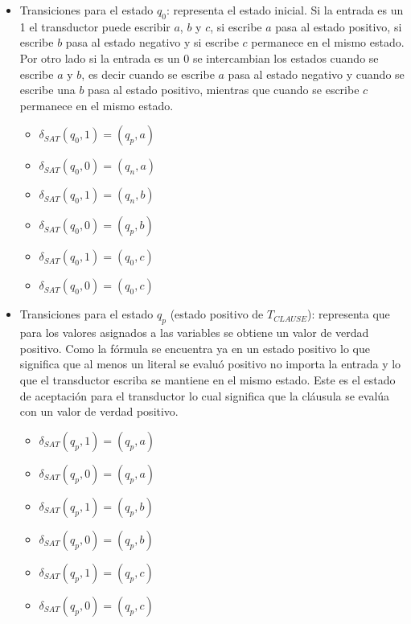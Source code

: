 \documentclass[12pt]{article}
\begin{document}
\begin{itemize}
    \item Transiciones para el estado $q_0$: representa el estado inicial. Si la entrada es un 1 el
          transductor puede escribir $a$, $b$ y $c$, si escribe $a$ pasa al estado positivo, si escribe $b$
          pasa al estado negativo y si escribe $c$ permanece en el mismo estado. Por otro lado si la entrada 
          es un 0 se intercambian los estados cuando se escribe $a$ y $b$, es decir cuando se escribe $a$
          pasa al estado negativo y cuando se escribe una $b$ pasa al estado positivo, mientras que cuando 
          se escribe $c$ permanece en el mismo estado.
          
          \begin{multicols}{2}
              \begin{itemize}
                  \item $\delta_{SAT}(q_0,1)=(q_p,a)$
                  \item $\delta_{SAT}(q_0,0)=(q_n,a)$
                  \item $\delta_{SAT}(q_0,1)=(q_n,b)$
                  \item $\delta_{SAT}(q_0,0)=(q_p,b)$
                  \item $\delta_{SAT}(q_0,1)=(q_0,c)$
                  \item $\delta_{SAT}(q_0,0)=(q_0,c)$
              \end{itemize}
          \end{multicols}
          
    \item Transiciones para el estado $q_p$ (estado positivo de $T_{CLAUSE}$): representa que para los valores
          asignados a las variables se obtiene un valor de verdad positivo.  Como la fórmula se encuentra ya en un 
          estado positivo lo que significa que al menos un literal se evaluó positivo no importa la 
          entrada y lo que el transductor escriba se mantiene en el mismo estado. Este es el estado de 
          aceptación para el transductor lo cual significa que la cláusula se evalúa con un valor de verdad positivo.
          \begin{multicols}{2}
              \begin{itemize}
                  \item $\delta_{SAT}(q_{p},1)=(q_{p},a)$
                  \item $\delta_{SAT}(q_{p},0)=(q_{p},a)$
                  \item $\delta_{SAT}(q_{p},1)=(q_{p},b)$
                  \item $\delta_{SAT}(q_{p},0)=(q_{p},b)$
                  \item $\delta_{SAT}(q_{p},1)=(q_{p},c)$
                  \item $\delta_{SAT}(q_{p},0)=(q_{p},c)$
              \end{itemize}
          \end{multicols}
          

\end{itemize}
\end{document}
